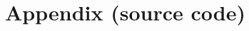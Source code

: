 \documentclass[a4paper,10pt]{article}
\begin{document}
\newpage

\section{Appendix (source code)}

%
%

\begin{comment}
Hvis Fern Time er lavet tilfÃ¸jes det her og begin og end comment skal fjernes. 
\textbf{Fern program}


\end{comment}
\end{document}
